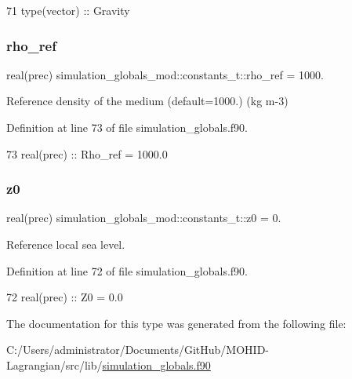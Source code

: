\begin{DoxyCode}
71         \textcolor{keywordtype}{type}(vector) :: Gravity
\end{DoxyCode}
\mbox{\label{structsimulation__globals__mod_1_1constants__t_a7e4a2bb5206340621bfce6792b527f6d}} 
\subsubsection{\texorpdfstring{rho\+\_\+ref}{rho\_ref}}
{\footnotesize\ttfamily real(prec) simulation\+\_\+globals\+\_\+mod\+::constants\+\_\+t\+::rho\+\_\+ref = 1000.\hspace{0.3cm}{\ttfamily [private]}}



Reference density of the medium (default=1000.) (kg m-\/3) 



Definition at line 73 of file simulation\+\_\+globals.\+f90.


\begin{DoxyCode}
73         \textcolor{keywordtype}{real(prec)}   :: Rho\_ref = 1000.0
\end{DoxyCode}
\mbox{\label{structsimulation__globals__mod_1_1constants__t_a737e824cf720aea683fe23939d12aa5b}} 
\subsubsection{\texorpdfstring{z0}{z0}}
{\footnotesize\ttfamily real(prec) simulation\+\_\+globals\+\_\+mod\+::constants\+\_\+t\+::z0 = 0.\hspace{0.3cm}{\ttfamily [private]}}



Reference local sea level. 



Definition at line 72 of file simulation\+\_\+globals.\+f90.


\begin{DoxyCode}
72         \textcolor{keywordtype}{real(prec)}   :: Z0 = 0.0
\end{DoxyCode}


The documentation for this type was generated from the following file\+:\begin{DoxyCompactItemize}
\item 
C\+:/\+Users/administrator/\+Documents/\+Git\+Hub/\+M\+O\+H\+I\+D-\/\+Lagrangian/src/lib/\mbox{\hyperlink{simulation__globals_8f90}{simulation\+\_\+globals.\+f90}}\end{DoxyCompactItemize}
